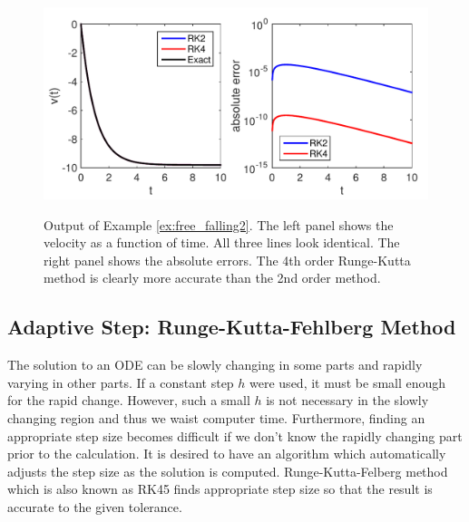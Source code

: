 \begin{figure}
	\centerline{\includegraphics[height=2.5in]{05.ode1/free_falling2.pdf}}
	\caption{Output of Example \ref{ex:free_falling2}.  The left panel shows the velocity as a function of time.  All three lines look identical. The right panel shows the absolute errors. The 4th order Runge-Kutta method is clearly more accurate than the 2nd order method.}
	\label{fig:free_falling2}
\end{figure}

\noindent
\subsection{Adaptive Step: Runge-Kutta-Fehlberg Method}

The solution to an ODE can be slowly changing in some parts and rapidly varying in other parts.  If a constant step $h$ were used, it must be small enough for the rapid change.  However, such a small $h$ is not necessary in the slowly changing region and thus we waist computer time.  Furthermore, finding an appropriate step size becomes difficult if we don't know the rapidly changing part prior to the calculation.  It is desired to have an algorithm which automatically adjusts the step size as the solution is computed.  Runge-Kutta-Felberg method which is also known as RK45 finds appropriate step size so that the result is accurate to the given tolerance.

